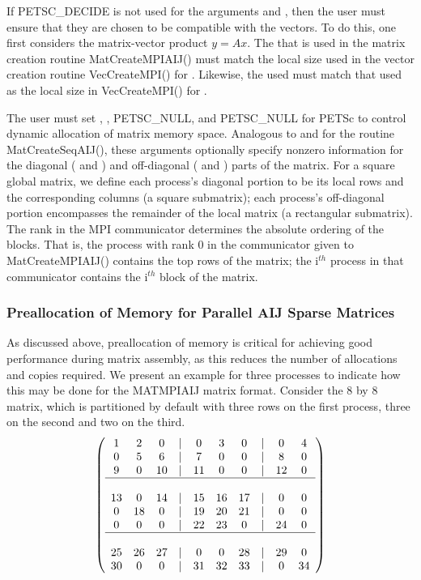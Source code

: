 If PETSC_DECIDE is not used for the arguments
 and , then the user must ensure that they are chosen to be
compatible with the vectors. To do this, one first considers the matrix-vector product 
$y = A x$. The  that is used in the matrix creation routine MatCreateMPIAIJ()
must match the local size used in the vector creation routine VecCreateMPI() for .
Likewise, the  used must match that used as the local size in 
VecCreateMPI() for . 

The user must set , , PETSC_NULL, and 
PETSC_NULL for PETSc to control dynamic allocation of matrix
memory space.  Analogous to  and  for the routine 
MatCreateSeqAIJ(), these arguments optionally specify 
nonzero information for the diagonal ( and ) and 
off-diagonal ( and ) parts of the matrix. 
For a square global matrix, we define each process's diagonal portion 
to be its local rows and the corresponding columns (a square submatrix);  
each process's off-diagonal portion encompasses the remainder of the
local matrix (a rectangular submatrix).  
The rank in the MPI communicator determines the absolute ordering of the
blocks.  That is, the process with rank 0 in the communicator given to  MatCreateMPIAIJ() contains the top rows of the matrix; the i$^{th}$ process
in that communicator contains the i$^{th}$ block of the matrix.

\subsubsection{Preallocation of Memory for Parallel AIJ Sparse Matrices}

As discussed above, preallocation of memory is critical for achieving good
performance during matrix assembly, as this reduces the number of
allocations and copies required.  We present an example for
three processes to indicate how this may be done for the MATMPIAIJ
matrix format.  Consider the 8 by
8 matrix, which is partitioned by default with three rows on the first
process, three on the second and two on the third.  {\small
\[
\left( \begin{array}{cccccccccc} 
1  & 2  & 0  & | & 0  & 3  & 0  & |  & 0  & 4  \\
0  & 5  & 6  & | & 7  & 0  & 0  & |  & 8  & 0 \\
9  & 0  & 10 & | & 11 & 0  & 0  & |  & 12 & 0  \\
\hline \\
13 & 0  & 14 & | & 15 & 16 & 17 & |  & 0  & 0  \\
0  & 18 & 0  & | & 19 & 20 & 21 & |  & 0  & 0 \\
0  & 0  & 0  & | & 22 & 23 & 0  & |  & 24 & 0 \\
\hline \\
25 & 26 & 27 & | & 0  & 0  & 28 & |  & 29 & 0 \\
30 & 0  & 0  & | & 31 & 32 & 33 & |  & 0  &34 
\end{array} \right)
\]
}

